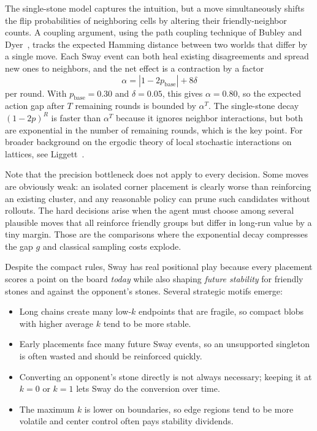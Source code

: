 The single-stone model captures the intuition, but a move simultaneously shifts the flip probabilities of neighboring cells by altering their friendly-neighbor counts.
A coupling argument, using the path coupling technique of Bubley and Dyer~\cite{bubley1997}, tracks the expected Hamming distance between two worlds that differ by a single move.
Each Sway event can both heal existing disagreements and spread new ones to neighbors, and the net effect is a contraction by a factor
\begin{equation}
\alpha = |1 - 2p_{\text{base}}| + 8\delta
\end{equation}
per round.
With $p_{\text{base}} = 0.30$ and $\delta = 0.05$, this gives $\alpha = 0.80$, so the expected action gap after $T$ remaining rounds is bounded by $\alpha^T$.
The single-stone decay $(1 - 2p)^R$ is faster than $\alpha^T$ because it ignores neighbor interactions, but both are exponential in the number of remaining rounds, which is the key point.
For broader background on the ergodic theory of local stochastic interactions on lattices, see Liggett~\cite{liggett1985}.

Note that the precision bottleneck does not apply to every decision. Some moves are obviously weak: an isolated corner placement is clearly worse than reinforcing an existing cluster, and any reasonable policy can prune such candidates without rollouts. The hard decisions arise when the agent must choose among several plausible moves that all reinforce friendly groups but differ in long-run value by a tiny margin. Those are the comparisons where the exponential decay compresses the gap $g$ and classical sampling costs explode.

Despite the compact rules, Sway has real positional play because every placement scores a point on the board \emph{today} while also shaping \emph{future stability} for friendly stones and against the opponent's stones.
Several strategic motifs emerge:

\begin{itemize}
  \item Long chains create many low-$k$ endpoints that are fragile, so compact blobs with higher average $k$ tend to be more stable.
  \item Early placements face many future Sway events, so an unsupported singleton is often wasted and should be reinforced quickly.
  \item Converting an opponent's stone directly is not always necessary; keeping it at $k = 0$ or $k = 1$ lets Sway do the conversion over time.
  \item The maximum $k$ is lower on boundaries, so edge regions tend to be more volatile and center control often pays stability dividends.
\end{itemize}

